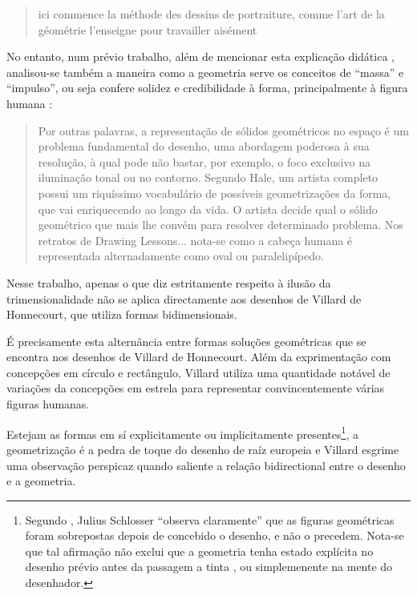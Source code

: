 \documentclass{article}
\begin{document}
\begin{quote}
ici commence la méthode des dessins de portraiture, comme l'art de la
géométrie l'enseigne pour travailler aisément
\end{quote}

No entanto, num prévio trabalho, além de mencionar esta explicação
didática \cite[p. 17]{tavora}, analisou-se também a maneira como a
geometria serve os conceitos de ``massa'' e ``impulso'', ou seja
confere solidez e credibilidade à forma, principalmente à figura
humana \cite[p. 6]{tavora}:

\begin{quote}
  Por outras palavras, a representação de sólidos geométricos no
  espaço é um problema fundamental do desenho, uma abordagem poderosa
  à sua resolução, à qual pode não bastar, por exemplo, o foco
  exclusivo na iluminação tonal ou no contorno. Segundo Hale, um
  artista completo possui um riquíssimo vocabulário de possíveis
  geometrizações da forma, que vai enriquecendo ao longo da vida. O
  artista decide qual o sólido geométrico que mais lhe convém para
  resolver determinado problema. Nos retratos de Drawing
  Lessons... nota-se como a cabeça humana é representada
  alternadamente como oval ou paralelipípedo.
\end{quote}

Nesse trabalho, apenas o que diz estritamente respeito à ilusão da
trimensionalidade não se aplica directamente aos desenhos de Villard
de Honnecourt, que utiliza formas bidimensionais.

É precisamente esta alternância entre formas soluções geométricas que
se encontra nos desenhos de Villard de Honnecourt. Além da
exprimentação com concepções em círculo e rectângulo, Villard utiliza
uma quantidade notável de variações da concepções em estrela para
representar convincentemente várias figuras humanas.

Estejam as formas em sí explicitamente ou implicitamente
presentes\footnote{Segundo \cite{teresa}, Julius Schlosser ``observa
  claramente'' que as figuras geométricas foram sobrepostas depois de
  concebido o desenho, e não o precedem. Nota-se que tal afirmação não
  exclui que a geometria tenha estado explícita no desenho prévio
  antes da passagem a tinta \cite{calado}, ou simplemenente na mente
  do desenhador.}, a geometrização é a pedra de toque do desenho de
raíz europeia e Villard esgrime uma observação perspicaz quando
saliente a relação bidirectional entre o desenho e a geometria.
\end{document}
